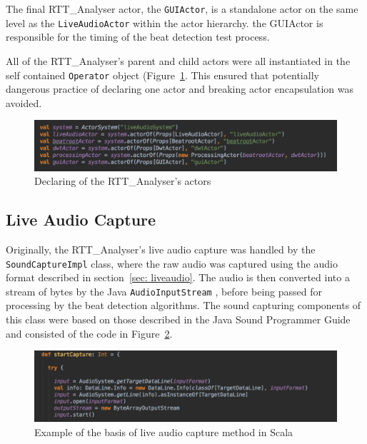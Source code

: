 \documentclass[a4paper, 11pt]{article}
\begin{document}
The final RTT\_Analyser actor, the \texttt{GUIActor}, is a standalone actor on the same level as the \texttt{LiveAudioActor} within the actor hierarchy. the GUIActor is responsible for the timing of the beat detection test process.\par

All of the RTT\_Analyser's parent and child actors were all instantiated in the self contained \texttt{Operator} object (Figure~\ref{fig: props}. This ensured that potentially dangerous practice of declaring one actor and breaking actor encapsulation \cite{akkaActors} was avoided.  

\begin{figure}[h]
\centering
\includegraphics[scale=0.35]{images/actorprops.jpg}
\caption{Declaring of the RTT\_Analyser's actors}
\label{fig: props}
\end{figure}

\subsection{Live Audio Capture}
Originally, the RTT\_Analyser's live audio capture was handled by the \texttt{SoundCaptureImpl} class, where the raw audio was captured using the audio format described in section~\ref{sec: liveaudio}. The audio is then converted into a stream of bytes by the Java \texttt{AudioInputStream} \cite{soundTrail}, before being passed for processing by the beat detection algorithms. The sound capturing components of this class were based on those described in the Java Sound Programmer Guide \cite{javasound} and consisted of the code in Figure~\ref{fig: startcap}.

\begin{figure}[h]
\centering
\includegraphics[scale=0.3]{images/startCap.jpg}
\caption{Example of the basis of live audio capture method in Scala}
\label{fig: startcap}
\end{figure}
\end{document}
